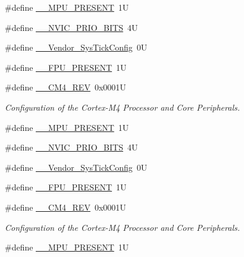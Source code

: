 \begin{DoxyCompactItemize}
\#define \hyperlink{group___configuration__section__for___c_m_s_i_s_ga4127d1b31aaf336fab3d7329d117f448}{\+\_\+\+\_\+\+M\+P\+U\+\_\+\+P\+R\+E\+S\+E\+NT}~1U
\item 
\#define \hyperlink{group___configuration__section__for___c_m_s_i_s_gae3fe3587d5100c787e02102ce3944460}{\+\_\+\+\_\+\+N\+V\+I\+C\+\_\+\+P\+R\+I\+O\+\_\+\+B\+I\+TS}~4U
\item 
\#define \hyperlink{group___configuration__section__for___c_m_s_i_s_gab58771b4ec03f9bdddc84770f7c95c68}{\+\_\+\+\_\+\+Vendor\+\_\+\+Sys\+Tick\+Config}~0U
\item 
\#define \hyperlink{group___configuration__section__for___c_m_s_i_s_gac1ba8a48ca926bddc88be9bfd7d42641}{\+\_\+\+\_\+\+F\+P\+U\+\_\+\+P\+R\+E\+S\+E\+NT}~1U
\item 
\#define \hyperlink{group___configuration__section__for___c_m_s_i_s_ga45a97e4bb8b6ce7c334acc5f45ace3ba}{\+\_\+\+\_\+\+C\+M4\+\_\+\+R\+EV}~0x0001U
\begin{DoxyCompactList}\small\item\em Configuration of the Cortex-\/\+M4 Processor and Core Peripherals. \end{DoxyCompactList}\item 
\#define \hyperlink{group___configuration__section__for___c_m_s_i_s_ga4127d1b31aaf336fab3d7329d117f448}{\+\_\+\+\_\+\+M\+P\+U\+\_\+\+P\+R\+E\+S\+E\+NT}~1U
\item 
\#define \hyperlink{group___configuration__section__for___c_m_s_i_s_gae3fe3587d5100c787e02102ce3944460}{\+\_\+\+\_\+\+N\+V\+I\+C\+\_\+\+P\+R\+I\+O\+\_\+\+B\+I\+TS}~4U
\item 
\#define \hyperlink{group___configuration__section__for___c_m_s_i_s_gab58771b4ec03f9bdddc84770f7c95c68}{\+\_\+\+\_\+\+Vendor\+\_\+\+Sys\+Tick\+Config}~0U
\item 
\#define \hyperlink{group___configuration__section__for___c_m_s_i_s_gac1ba8a48ca926bddc88be9bfd7d42641}{\+\_\+\+\_\+\+F\+P\+U\+\_\+\+P\+R\+E\+S\+E\+NT}~1U
\item 
\#define \hyperlink{group___configuration__section__for___c_m_s_i_s_ga45a97e4bb8b6ce7c334acc5f45ace3ba}{\+\_\+\+\_\+\+C\+M4\+\_\+\+R\+EV}~0x0001U
\begin{DoxyCompactList}\small\item\em Configuration of the Cortex-\/\+M4 Processor and Core Peripherals. \end{DoxyCompactList}\item 
\#define \hyperlink{group___configuration__section__for___c_m_s_i_s_ga4127d1b31aaf336fab3d7329d117f448}{\+\_\+\+\_\+\+M\+P\+U\+\_\+\+P\+R\+E\+S\+E\+NT}~1U

\end{DoxyCompactItemize}
